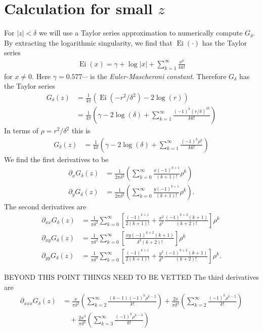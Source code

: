 \documentclass[12pt]{amsart}
\DeclareMathOperator{\Ei}{Ei}
\begin{document}
\section{Calculation for small $z$}
For $|z| < \delta$ we will use a Taylor series approximation to numerically compute $G_\delta$.
By extracting the logarithmic singularity, we find that $\Ei(\cdot)$ has the Taylor series
\begin{align*}
	\Ei(x) = \gamma + \log |x| + \sum_{k=1}^\infty \frac{x^k}{k k!}
\end{align*}
for $x \neq 0$.
Here $\gamma = 0.577 \cdots $ is the \emph{Euler-Mascheroni constant}.
Therefore $G_\delta$ has the Taylor series
\begin{align*}
	G_\delta(z) &= \frac{1}{4\pi} ( \Ei( -r^2/\delta^2) - 2 \log(r) ) \\
		&= \frac{1}{4\pi} \left( \gamma - 2 \log (\delta) + \sum_{k=1}^\infty \frac{ (-1)^k(r/\delta)^{2k}}{k k!} \right)
\end{align*}
In terms of $\rho = r^2/\delta^2$ this is
\begin{align*}
	G_\delta (z) &= \frac{1}{4\pi} \left( \gamma - 2 \log (\delta) + \sum_{k=1}^\infty \frac{ (-1)^k \rho^k }{k k!} \right)
\end{align*}
We find the first derivatives to be
\begin{align*}
	\partial_x G_\delta(z) &= \frac{1}{2\pi \delta^2} \left( \sum_{k=0}^\infty \frac{  x (-1)^{k+1} }{ (k+1)!} \rho^{k} \right) \\
	\partial_y G_\delta(z) &= \frac{1}{2\pi \delta^2} \left( \sum_{k=0}^\infty \frac{  y (-1)^{k+1} }{ (k+1)!} \rho^{k} \right).
\end{align*}
The second derivatives are
\begin{align*}
	\partial_{xx}G_\delta(z) &=  \frac{1}{\pi \delta^2} \sum_{k=0}^{\infty} \left[ \frac{ (-1)^{k+1} }{ 2(k+1)!} + \frac{x^2}{\delta^2} \frac{ (-1)^{k+2} (k+1)}{ (k+2)!} \right] \rho^k \\
	\partial_{xy}G_\delta(z) &=  \frac{1}{\pi \delta^2} \sum_{k=0}^\infty \left[  \frac{  xy (-1)^{k+2} (k+1) }{ \delta^2 (k+2)!} \right] \rho^k \\
	\partial_{yy}G_\delta(z) &=  \frac{1}{\pi \delta^2} \sum_{k=0}^{\infty} \left[ \frac{ (-1)^{k+1} }{ 2(k+1)!} + \frac{y^2}{\delta^2} \frac{ (-1)^{k+2} (k+1)}{ (k+2)!} \right] \rho^k .
\end{align*}

BEYOND THIS POINT THINGS NEED TO BE VETTED
The third derivatives are
\begin{align*}
	\partial_{xxx} G_\delta(z) &= \frac{x}{\pi \delta^2} \left( \sum_{k=2}^\infty \frac{ (k-1) (-1)^k \rho^{k-2} }{ k!} \right) +  \frac{2x}{\pi \delta^4} \left( \sum_{k=2}^\infty \frac{  (-1)^k \rho^{k-2} }{ k!} \right)\\
		&\quad + \frac{2x^3}{\pi \delta^6} \left( \sum_{k=3}^\infty \frac{  (-1)^k \rho^{k-3} }{ k!} \right)
\end{align*}
\end{document}
